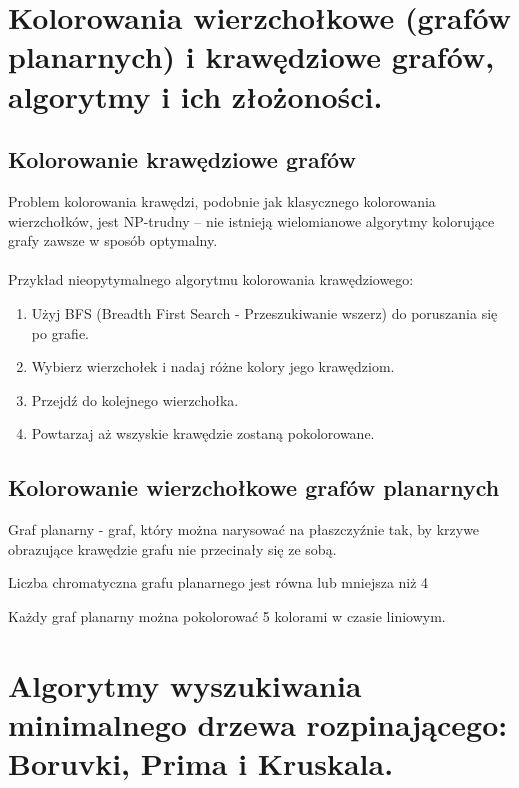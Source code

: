 \documentclass[main.tex]{subfiles}
\begin{document}
    \newpage

    \section{Kolorowania wierzchołkowe (grafów planarnych) i krawędziowe grafów, algorytmy i ich złożoności.}

    \subsection{Kolorowanie krawędziowe grafów}
    Problem kolorowania krawędzi, podobnie jak klasycznego kolorowania wierzchołków, jest NP-trudny – nie istnieją wielomianowe algorytmy kolorujące grafy zawsze w sposób optymalny.
    \\\\
    Przykład nieopytymalnego algorytmu kolorowania krawędziowego:
    \begin{enumerate}
        \item Użyj BFS (Breadth First Search - Przeszukiwanie wszerz) do poruszania się po grafie.
        \item Wybierz wierzchołek i nadaj różne kolory jego krawędziom.
        \item Przejdź do kolejnego wierzchołka.
        \item Powtarzaj aż wszyskie krawędzie zostaną pokolorowane.
    \end{enumerate}

    \subsection{Kolorowanie wierzchołkowe grafów planarnych}

    \begin{definition}
        Graf planarny - graf, który można narysować na płaszczyźnie tak, by krzywe obrazujące krawędzie grafu nie przecinały się ze sobą.
    \end{definition}

    \begin{theorem}
        Liczba chromatyczna grafu planarnego jest równa lub mniejsza niż 4
    \end{theorem}

    Każdy graf planarny można pokolorować 5 kolorami w czasie liniowym.





    \newpage

    \section{Algorytmy wyszukiwania minimalnego drzewa rozpinającego: Boruvki, Prima i Kruskala.}
\end{document}

